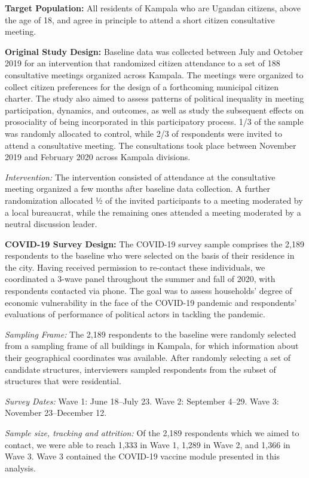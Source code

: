 \documentclass[
  12pt,
]{article}
\begin{document}
\textbf{Target Population:} All residents of Kampala who are Ugandan citizens, above the age of 18, and agree in principle to attend a short citizen consultative meeting.

\textbf{Original Study Design:} Baseline data was collected between July and October 2019 for an intervention that randomized citizen attendance to a set of 188 consultative meetings organized across Kampala. The meetings were organized to collect citizen preferences for the design of a forthcoming municipal citizen charter. The study also aimed to assess patterns of political inequality in meeting participation, dynamics, and outcomes, as well as study the subsequent effects on prosociality of being incorporated in this participatory process. 1/3 of the sample was randomly allocated to control, while 2/3 of respondents were invited to attend a consultative meeting. The consultations took place between November 2019 and February 2020 across Kampala divisions.

\emph{Intervention:} The intervention consisted of attendance at the consultative meeting organized a few months after baseline data collection. A further randomization allocated ½ of the invited participants to a meeting moderated by a local bureaucrat, while the remaining ones attended a meeting moderated by a neutral discussion leader.

\textbf{COVID-19 Survey Design:} The COVID-19 survey sample comprises the 2,189 respondents to the baseline who were selected on the basis of their residence in the city. Having received permission to re-contact these individuals, we coordinated a 3-wave panel throughout the summer and fall of 2020, with respondents contacted via phone. The goal was to assess households' degree of economic vulnerability in the face of the COVID-19 pandemic and respondents' evaluations of performance of political actors in tackling the pandemic.

\emph{Sampling Frame:} The 2,189 respondents to the baseline were randomly selected from a sampling frame of all buildings in Kampala, for which information about their geographical coordinates was available. After randomly selecting a set of candidate structures, interviewers sampled respondents from the subset of structures that were residential.

\emph{Survey Dates:} Wave 1: June 18--July 23. Wave 2: September 4--29. Wave 3: November 23--December 12.

\emph{Sample size, tracking and attrition:} Of the 2,189 respondents which we aimed to contact, we were able to reach 1,333 in Wave 1, 1,289 in Wave 2, and 1,366 in Wave 3. Wave 3 contained the COVID-19 vaccine module presented in this analysis.
\end{document}
